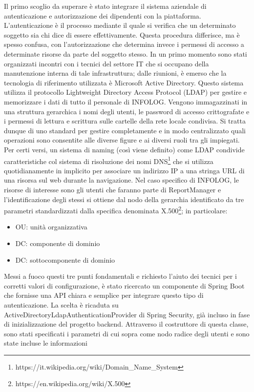 Il primo scoglio da superare è stato integrare il sistema aziendale di autenticazione e autorizzazione dei dipendenti con la piattaforma.
L'autenticazione è il processo mediante il quale si verifica che un determinato soggetto sia chi dice di essere effettivamente.
Questa procedura differisce, ma è spesso confusa, con l'autorizzazione che determina invece i permessi di accesso a determinate risorse da parte del soggetto stesso.
In un primo momento sono stati organizzati incontri con i tecnici del settore IT che si occupano della manutenzione interna di tale infrastruttura; dalle riunioni, è
emerso che la tecnologia di riferimento utilizzata è Microsoft Active Directory.
Questo sistema utilizza il protocollo Lightweight Directory Access Protocol (LDAP) per gestire e memorizzare i dati di tutto il personale di INFOLOG.
Vengono immagazzinati in una struttura gerarchica i nomi degli utenti, le password di accesso crittografate e i permessi di lettura e scrittura sulle cartelle della rete locale 
condivisa.
Si tratta dunque di uno standard per gestire completamente e in modo centralizzato quali operazioni sono consentite alle diverse figure e ai diversi ruoli tra gli impiegati.
Per certi versi, un sistema di naming (così viene definito) come LDAP condivide caratteristiche col sistema di risoluzione dei nomi DNS\footnote{https://it.wikipedia.org/wiki/Domain\_Name\_System} 
che si utilizza quotidianamente in implicito per associare un indirizzo IP a una stringa URL di una risorsa sul web durante la navigazione.
Nel caso specifico di INFOLOG, le risorse di interesse sono gli utenti che faranno parte di ReportManager e l'identificazione degli stessi si ottiene dal nodo della gerarchia
identificato da tre parametri standardizzati dalla specifica denominata X.500\footnote{https://en.wikipedia.org/wiki/X.500}; in particolare:
\begin{itemize}
    \item OU: unità organizzativa
    \item DC: componente di dominio
    \item DC: sottocomponente di dominio
\end{itemize}
Messi a fuoco questi tre punti fondamentali e richiesto l'aiuto dei tecnici per i corretti valori di configurazione, è stato ricercato un componente di Spring Boot che fornisse 
una API chiara e semplice per integrare questo tipo di autenticazione.
La scelta è ricaduta su ActiveDirectoryLdapAuthenticationProvider di Spring Security, già incluso in fase di inizializzazione del progetto backend.
Attraverso il costruttore di questa classe, sono stati specificati i parametri di cui sopra come nodo radice degli utenti e sono state incluse le informazioni
